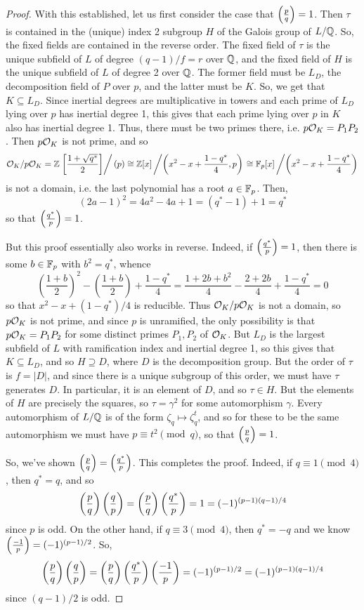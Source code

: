 \begin{proof}
	With this established, let us first consider the case that $\left(\frac{p}{q}\right) = 1$. Then $\tau$ is contained in the (unique) index 2 subgroup $H$ of the Galois group of $L/\mathbb{Q}$. So, the fixed fields are contained in the reverse order. The fixed field of $\tau$ is the unique subfield of $L$ of degree $(q-1)/f = r$ over $\mathbb{Q}$, and the fixed field of $H$ is the unique subfield of $L$ of degree 2 over $\mathbb{Q}$. The former field must be $L_D$, the decomposition field of $P$ over $p$, and the latter must be $K$. So, we get that $K \subseteq L_D$. Since inertial degrees are multiplicative in towers and each prime of $L_D$ lying over $p$ has inertial degree 1, this gives that each prime lying over $p$ in $K$ also has inertial degree 1. Thus, there must be two primes there, i.e. $p\mathcal{O}_K = P_1P_2$. Then $p\mathcal{O}_K$ is not prime, and so
	\[ \mathcal{O}_K/p\mathcal{O}_K = \mathbb{Z}\left.\left[\frac{1+\sqrt{q^\ast}}{2}\right]\right/(p) \cong \mathbb{Z}[x]\left/\left(x^2-x+\frac{1-q^\ast}{4},p\right)\right. \cong \mathbb{F}_p[x]\left/\left(x^2-x+\frac{1-q^\ast}{4}\right)\right. \]
	is not a domain, i.e. the last polynomial has a root $a \in \mathbb{F}_p$. Then,
	\[ (2a-1)^2 = 4a^2-4a+1 = (q^\ast-1)+1 = q^\ast \]
	so that $\left(\frac{q^\ast}{p}\right) = 1$.
	
	But this proof essentially also works in reverse. Indeed, if $\left(\frac{q^\ast}{p}\right) = 1$, then there is some $b \in \mathbb{F}_p$ with $b^2 = q^\ast$, whence
	\[ \left(\frac{1+b}{2}\right)^2-\left(\frac{1+b}{2}\right)+\frac{1-q^\ast}{4} = \frac{1+2b+b^2}{4}-\frac{2+2b}{4}+\frac{1-q^\ast}{4} = 0 \]
	so that $x^2-x+(1-q^\ast)/4$ is reducible. Thus $\mathcal{O}_K/p\mathcal{O}_K$ is not a domain, so $p\mathcal{O}_K$ is not prime, and since $p$ is unramified, the only possibility is that $p\mathcal{O}_K = P_1P_2$ for some distinct primes $P_1,P_2$ of $\mathcal{O}_K$. But $L_D$ is the largest subfield of $L$ with ramification index and inertial degree 1, so this gives that $K \subseteq L_D$, and so $H \supseteq D$, where $D$ is the decomposition group. But the order of $\tau$ is $f = |D|$, and since there is a unique subgroup of this order, we must have $\tau$ generates $D$. In particular, it is an element of $D$, and so $\tau \in H$. But the elements of $H$ are precisely the squares, so $\tau = \gamma^2$ for some automorphism $\gamma$. Every automorphism of $L/\mathbb{Q}$ is of the form $\zeta_q \mapsto \zeta_q^t$, and so for these to be the same automorphism we must have $p \equiv t^2 \pmod{q}$, so that $\left(\frac{p}{q}\right) = 1$.

	So, we've shown $\left(\frac{p}{q}\right) = \left(\frac{q^\ast}{p}\right)$. This completes the proof. Indeed, if $q \equiv 1 \pmod{4}$, then $q^\ast = q$, and so
	\[ \left(\frac{p}{q}\right)\left(\frac{q}{p}\right) = \left(\frac{p}{q}\right)\left(\frac{q^\ast}{p}\right) = 1 = (-1)^{(p-1)(q-1)/4} \]
	since $p$ is odd. On the other hand, if $q \equiv 3 \pmod{4}$, then $q^\ast = -q$ and we know $\left(\frac{-1}{p}\right) = (-1)^{(p-1)/2}$. So,
	\[ \left(\frac{p}{q}\right)\left(\frac{q}{p}\right) = \left(\frac{p}{q}\right)\left(\frac{q^\ast}{p}\right)\left(\frac{-1}{p}\right) = (-1)^{(p-1)/2} = (-1)^{(p-1)(q-1)/4} \]
	since $(q-1)/2$ is odd.
\end{proof}

